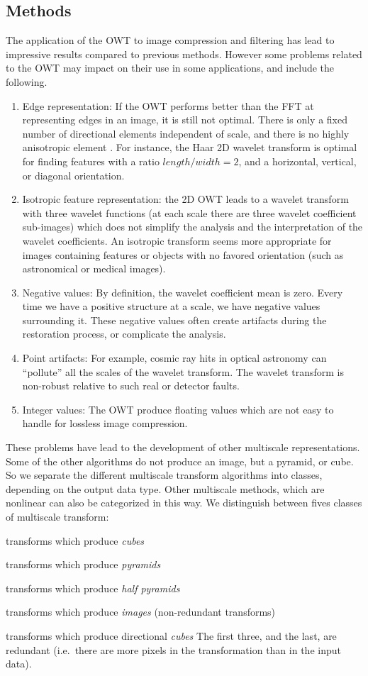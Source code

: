 \subsection{Methods}
The application of the OWT to image compression and filtering
has lead to impressive results compared to previous methods.
However some problems related to the OWT may impact on their 
use in some applications, and include the following.
\begin{enumerate}
\item Edge representation: If the OWT performs better than
the FFT at representing edges in an image, it is still not optimal.
There is only a fixed number of directional elements independent of scale,
and there is no highly anisotropic element \cite{cur:candes99_1}. 
For instance, the Haar 2D 
wavelet transform is optimal for finding features with a  
ratio $length/width = 2$, and a horizontal, vertical, or diagonal 
orientation.
\item Isotropic feature representation:
the 2D OWT \cite{wave:mallat89} leads to a wavelet
transform with three wavelet functions (at each scale there are
three wavelet coefficient sub-images) which does not simplify the analysis and
the interpretation of the wavelet coefficients. An isotropic transform
seems more appropriate for images containing features or objects with 
no favored orientation (such as astronomical or medical images).
\item Negative values:
By definition, the wavelet coefficient mean is zero. Every time we have
a positive structure at a scale, we have negative values surrounding it. These
negative values often create artifacts during the restoration process, or
complicate the analysis.
\item Point artifacts: For example, cosmic ray hits in optical astronomy
can ``pollute'' all
the scales of the wavelet transform. The wavelet transform is non-robust
relative to such real or detector faults. 
\item Integer values: The OWT produce floating values which are not 
easy to handle for lossless image compression. 
\end{enumerate}
These problems have lead to the development of other multiscale 
representations. Some of the other algorithms do not produce an image, 
but a pyramid, or cube.
So we separate the different multiscale transform algorithms into classes, 
depending on the output data type. Other multiscale methods, which are
nonlinear can also be categorized in this way. We distinguish between
fives classes of multiscale transform: 
\bn
\item transforms which produce {\em cubes}
\item transforms which produce  {\em pyramids}
\item transforms which produce  {\em half pyramids}
\item transforms which produce {\em images} (non-redundant transforms)
\item transforms which produce directional {\em cubes}
\en
The first three, and the last,  are redundant 
(i.e.\ there are more pixels in the transformation
than in the input data).

